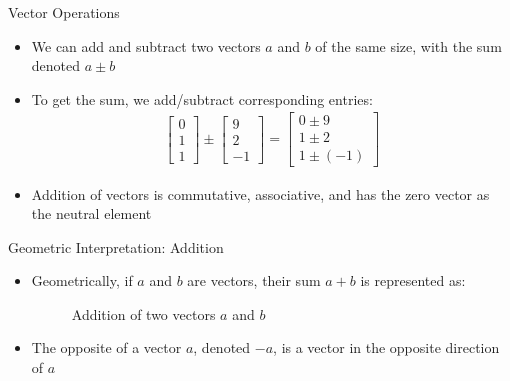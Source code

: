 \begin{frame}{Vector Operations}
\begin{itemize}
    \item We can add and subtract two vectors $a$ and $b$ of the same size, with the sum denoted $a \pm b$
    \item To get the sum, we add/subtract corresponding entries:
    \begin{align*}
        \begin{bmatrix}
            0\\
            1\\
            1
        \end{bmatrix} \pm \begin{bmatrix}
            9\\
            2\\
            -1
        \end{bmatrix} = \begin{bmatrix}
            0 \pm 9\\
            1 \pm 2\\
            1 \pm (-1)
        \end{bmatrix}
    \end{align*}
    \item Addition of vectors is commutative, associative, and has the zero vector as the neutral element
\end{itemize}
\end{frame}

\begin{frame}{Geometric Interpretation: Addition}
\begin{itemize}
    \item Geometrically, if $a$ and $b$ are vectors, their sum $a+b$ is represented as:
    \begin{figure}[h]
        \centering
        \caption{Addition of two vectors $a$ and $b$}
        \label{fig:vector-addition}
    \end{figure}
    \item The opposite of a vector $a$, denoted $-a$, is a vector in the opposite direction of $a$
\end{itemize}
\end{frame}

